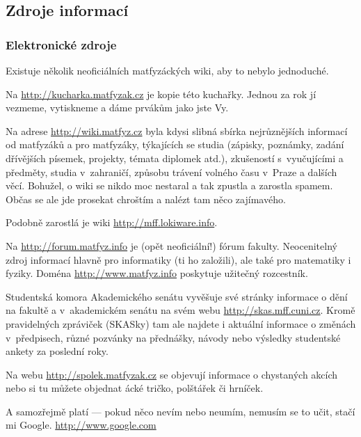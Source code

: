 \subsection{Zdroje informací}
\smallskip %
\subsubsection{Elektronické zdroje}
\medskip
{}

Existuje několik neoficiálních matfyzáckých wiki, aby to nebylo jednoduché.

Na \url{http://kucharka.matfyzak.cz} je kopie této kuchařky. Jednou za rok jí vezmeme, vytiskneme a dáme prvákům jako jste Vy.

Na adrese \url{http://wiki.matfyz.cz} byla kdysi slibná sbírka nejrůznějších informací od matfyzáků a pro matfyzáky, týkajících se studia (zápisky, poznámky, zadání dřívějších písemek, projekty, témata diplomek atd.), zkušeností s~vyučujícími a předměty, studia v~zahraničí, způsobu trávení volného času v~Praze a dalších věcí. Bohužel, o wiki se nikdo moc nestaral a tak zpustla a zarostla spamem. Občas se ale jde prosekat chroštím a nalézt tam něco zajímavého.

Podobně zarostlá je wiki \url{http://mff.lokiware.info}.

Na \url{http://forum.matfyz.info} je (opět neoficiální!) fórum fakulty. Neocenitelný zdroj informací hlavně pro informatiky (ti ho založili), ale také pro matematiky i fyziky. Doména \url{http://www.matfyz.info} poskytuje užitečný rozcestník.

Studentská komora Akademického senátu vyvěšuje své stránky informace o dění na fakultě a v~akademickém senátu na svém webu \url{http://skas.mff.cuni.cz}. Kromě pravidelných zpráviček (SKASky) tam ale najdete i aktuální informace o změnách v~předpisech, různé pozvánky na přednášky, návody nebo výsledky studentské ankety za poslední roky.

Na webu \url{http://spolek.matfyzak.cz} se objevují informace o chystaných
akcích nebo si tu můžete objednat \mfz{}ácké tričko, polštářek či
hrníček.

A samozřejmě platí --- pokud něco nevím nebo neumím, nemusím se to učit, stačí mi Google. \url{http://www.google.com}

